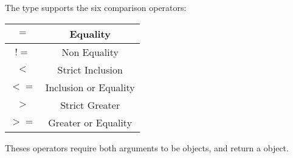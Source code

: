 The  type supports the six comparison operators:\newline

\begin{tabular}{|c|c|}
\hline
$=$ & Equality \\
\hline
$!=$ & Non Equality \\
\hline
$<$  & Strict Inclusion \\
\hline
$<=$  & Inclusion or Equality \\
\hline
$>$  & Strict Greater \\
\hline
$>=$  & Greater or Equality \\
\hline
\end{tabular}

Theses operators require both arguments to be  objects, and return a  object.


